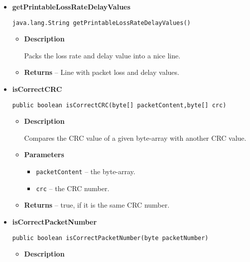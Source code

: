 {{{{{\begin{itemize}
{\begin{itemize}
{Creates a nice line for displaying the debug-status.
}
\item{{\bf  Returns} -- 
line with debug information. 
}%
\end{itemize}
}%
\item{ 
\hypertarget{filetransferUDP.FileTransfer.getPrintableLossRateDelayValues()}{{\bf  getPrintableLossRateDelayValues}\\}
\begin{lstlisting}[frame=none]
 java.lang.String getPrintableLossRateDelayValues()\end{lstlisting} %
\begin{itemize}
\item{
{\bf  Description}

Packs the loss rate and delay value into a nice line.
}
\item{{\bf  Returns} -- 
Line with packet loss and delay values. 
}%
\end{itemize}
}%
\item{ 
\hypertarget{filetransferUDP.FileTransfer.isCorrectCRC(byte[], byte[])}{{\bf  isCorrectCRC}\\}
\begin{lstlisting}[frame=none]
public boolean isCorrectCRC(byte[] packetContent,byte[] crc)\end{lstlisting} %
\begin{itemize}
\item{
{\bf  Description}

Compares the CRC value of a given byte-array with another CRC value.
}
\item{
{\bf  Parameters}
  \begin{itemize}
   \item{
\texttt{packetContent} -- the byte-array.}
   \item{
\texttt{crc} -- the CRC number.}
  \end{itemize}
}%
\item{{\bf  Returns} -- 
true, if it is the same CRC number. 
}%
\end{itemize}
}%
\item{ 
\hypertarget{filetransferUDP.FileTransfer.isCorrectPacketNumber(byte)}{{\bf  isCorrectPacketNumber}\\}
\begin{lstlisting}[frame=none]
public boolean isCorrectPacketNumber(byte packetNumber)\end{lstlisting} %
\begin{itemize}
\item{
{\bf  Description}

}
\end{itemize}}
\end{itemize}}}}}}
